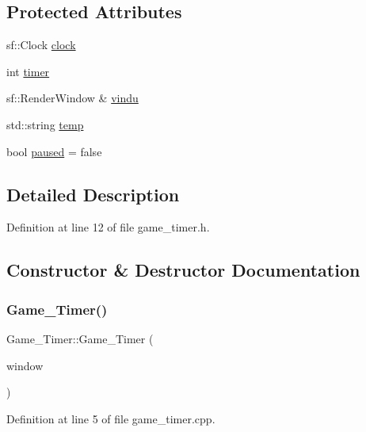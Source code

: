 \subsection*{Protected Attributes}
\begin{DoxyCompactItemize}
\item 
sf\+::\+Clock \hyperlink{class_game___timer_a0d0bd639a7113080aa7c6ba6d712ec38}{clock}
\item 
int \hyperlink{class_game___timer_a3d5fd5c7113df6f8a4a71130b74716c1}{timer}
\item 
sf\+::\+Render\+Window \& \hyperlink{class_game___timer_a09409d0e504612058311ec08a7f890f3}{vindu}
\item 
std\+::string \hyperlink{class_game___timer_ac18cf859f9839cf7b21b733125c3bdb6}{temp}
\item 
bool \hyperlink{class_game___timer_a8b0bfed6b2c70a9ab14398b6afcc1f16}{paused} = false
\end{DoxyCompactItemize}


\subsection{Detailed Description}


Definition at line 12 of file game\+\_\+timer.\+h.



\subsection{Constructor \& Destructor Documentation}
\hypertarget{class_game___timer_a88916106390a164bc9bc6ba3ba15f016}{}\label{class_game___timer_a88916106390a164bc9bc6ba3ba15f016} 
\subsubsection{\texorpdfstring{Game\+\_\+\+Timer()}{Game\_Timer()}}
{\footnotesize\ttfamily Game\+\_\+\+Timer\+::\+Game\+\_\+\+Timer (\begin{DoxyParamCaption}\item[{sf\+::\+Render\+Window \&}]{window }\end{DoxyParamCaption})}



Definition at line 5 of file game\+\_\+timer.\+cpp.



